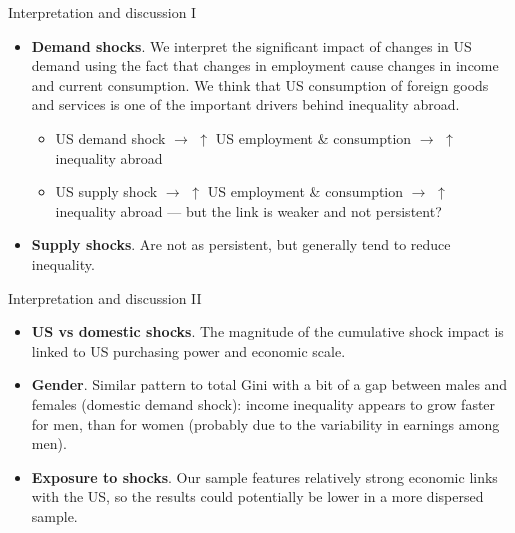 \documentclass[10pt,leqno,aspectratio=169,presentation]{beamer} %
\begin{document}
\begin{frame}{Interpretation and discussion I}
    \begin{itemize}
        \item<1-> \textbf{Demand shocks}. We interpret the significant impact of changes in US demand using the fact that changes in employment cause changes in income and current consumption. We think that US consumption of foreign goods and services is one of the important drivers behind inequality abroad.

        \begin{itemize}
            \item<2-> US demand shock $\rightarrow$ $\uparrow$ US employment \& consumption $\rightarrow$ $\uparrow$ inequality abroad
            \item<3-> US supply shock $\rightarrow$ $\uparrow$ US employment \& consumption $\rightarrow$ $\uparrow$ inequality abroad — but the link is weaker and not persistent?
        \end{itemize}
        
        \item<4-> \textbf{Supply shocks}. Are not as persistent, but generally tend to reduce inequality.
    \end{itemize}
\end{frame}

\begin{frame}{Interpretation and discussion II}
    \begin{itemize}
        \item<1-> \textbf{US vs domestic shocks}. The magnitude of the cumulative shock impact is linked to US purchasing power and economic scale.
        \item<2-> \textbf{Gender}. Similar pattern to total Gini with a bit of a gap between males and females (domestic demand shock): income inequality appears to grow faster for men, than for women (probably due to the variability in earnings among men).
        \item<3-> \textbf{Exposure to shocks}. Our sample features relatively strong economic links with the US, so the results could potentially be lower in a more dispersed sample.
    \end{itemize}
\end{frame}
\end{document}

